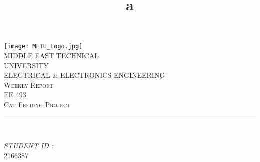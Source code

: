 \documentclass[12pt]{article}
\title{a}
\begin{document}

\begin{titlepage}
	\centering
    \vspace*{0.5 cm}
    \texttt{[image: METU\_Logo.jpg]}\\[0.5 cm]	%
    \textsc{\Large MIDDLE EAST TECHNICAL} \\[0.2 cm]
    \textsc{\Large UNIVERSITY} \\ [1.0 cm]
    \textsc{\large ELECTRICAL \& ELECTRONICS ENGINEERING} \\[0.2 cm]
    \textsc{\large Weekly Report \weekNum}\\[0.2 cm]
	\textsc{\large EE 493}\\[0.5 cm]				%
	\textsc{\large Cat Feeding Project}\\[0.2 cm]
	\rule{\linewidth}{0.2 mm} \\[0.2 cm]
	
	\begin{minipage}{0.4\textwidth}
		
			\begin{flushright} 
			\emph{STUDENT ID :} \\
			2166387\linebreak
		\end{flushright}
	\end{minipage}\\[2 cm]
	

 
	\vfill
	
\end{titlepage}


\tableofcontents










\end{document}
